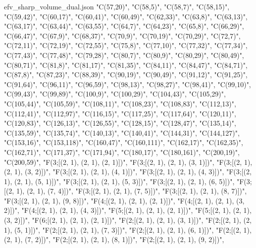 \documentclass[12pt,a4paper]{article}
\numberwithin{equation}{section}
\theoremstyle{definition}
\begin{document}
\begin{filecontents*}[overwrite]{efv_sharp_volume_dual.json}
    "C(57,20)",
    "C(58,5)",
    "C(58,7)",
    "C(58,15)",
    "C(59,42)",
    "C(60,17)",
    "C(60,41)",
    "C(60,49)",
    "C(62,33)",
    "C(63,8)",
    "C(63,13)",
    "C(63,17)",
    "C(63,44)",
    "C(63,55)",
    "C(64,7)",
    "C(64,23)",
    "C(65,8)",
    "C(66,29)",
    "C(66,47)",
    "C(67,9)",
    "C(68,37)",
    "C(70,9)",
    "C(70,19)",
    "C(70,29)",
    "C(72,7)",
    "C(72,11)",
    "C(72,19)",
    "C(72,55)",
    "C(75,8)",
    "C(77,10)",
    "C(77,32)",
    "C(77,34)",
    "C(77,43)",
    "C(77,48)",
    "C(79,28)",
    "C(80,7)",
    "C(80,9)",
    "C(80,29)",
    "C(80,49)",
    "C(80,71)",
    "C(81,8)",
    "C(81,17)",
    "C(81,35)",
    "C(84,11)",
    "C(84,47)",
    "C(84,71)",
    "C(87,8)",
    "C(87,23)",
    "C(88,39)",
    "C(90,19)",
    "C(90,49)",
    "C(91,12)",
    "C(91,25)",
    "C(91,64)",
    "C(96,11)",
    "C(96,59)",
    "C(98,13)",
    "C(98,27)",
    "C(98,41)",
    "C(99,10)",
    "C(99,43)",
    "C(99,89)",
    "C(100,9)",
    "C(100,29)",
    "C(104,43)",
    "C(105,29)",
    "C(105,44)",
    "C(105,59)",
    "C(108,11)",
    "C(108,23)",
    "C(108,83)",
    "C(112,13)",
    "C(112,41)",
    "C(112,97)",
    "C(116,15)",
    "C(117,25)",
    "C(117,64)",
    "C(120,11)",
    "C(120,83)",
    "C(126,13)",
    "C(126,55)",
    "C(128,15)",
    "C(128,47)",
    "C(135,14)",
    "C(135,59)",
    "C(135,74)",
    "C(140,13)",
    "C(140,41)",
    "C(144,31)",
    "C(144,127)",
    "C(153,16)",
    "C(153,118)",
    "C(160,47)",
    "C(160,111)",
    "C(162,17)",
    "C(162,35)",
    "C(162,71)",
    "C(171,37)",
    "C(171,94)",
    "C(180,17)",
    "C(180,161)",
    "C(200,19)",
    "C(200,59)",
    "F(3;[(2, 1), (2, 1), (2, 1)])",
    "F(3;[(2, 1), (2, 1), (3, 1)])",
    "F(3;[(2, 1), (2, 1), (3, 2)])",
    "F(3;[(2, 1), (2, 1), (4, 1)])",
    "F(3;[(2, 1), (2, 1), (4, 3)])",
    "F(3;[(2, 1), (2, 1), (5, 1)])",
    "F(3;[(2, 1), (2, 1), (5, 3)])",
    "F(3;[(2, 1), (2, 1), (6, 5)])",
    "F(3;[(2, 1), (2, 1), (7, 4)])",
    "F(3;[(2, 1), (2, 1), (7, 5)])",
    "F(3;[(2, 1), (2, 1), (8, 7)])",
    "F(3;[(2, 1), (2, 1), (9, 8)])",
    "F(4;[(2, 1), (2, 1), (2, 1)])",
    "F(4;[(2, 1), (2, 1), (3, 2)])",
    "F(4;[(2, 1), (2, 1), (4, 3)])",
    "F(5;[(2, 1), (2, 1), (2, 1)])",
    "F(5;[(2, 1), (2, 1), (3, 2)])",
    "F(6;[(2, 1), (2, 1), (2, 1)])",
    "F(2;[(2, 1), (2, 1), (3, 1)])",
    "F(2;[(2, 1), (2, 1), (5, 1)])",
    "F(2;[(2, 1), (2, 1), (7, 3)])",
    "F(2;[(2, 1), (2, 1), (6, 1)])",
    "F(2;[(2, 1), (2, 1), (7, 2)])",
    "F(2;[(2, 1), (2, 1), (8, 1)])",
    "F(2;[(2, 1), (2, 1), (9, 2)])",

\end{filecontents*}
\end{document}
